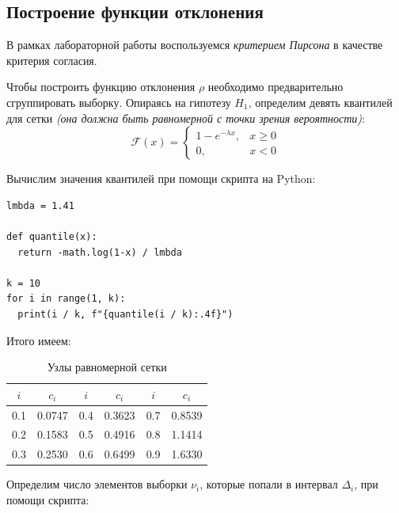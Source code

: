 \subsection{Построение функции отклонения}

В рамках лабораторной работы воспользуемся \textit{критерием Пирсона} в качестве критерия согласия.

Чтобы построить функцию отклонения \( \rho \) необходимо предварительно сгруппировать выборку. Опираясь на гипотезу \( H_1 \), определим девять квантилей для сетки \textit{(она должна быть равномерной с точки зрения вероятности)}:
\[
    \mathcal{F}(x)=
    \begin{cases}
        1-e^{-\lambda x}, &x\geq 0\\
        0, & x<0
    \end{cases}
\]

Вычислим значения квантилей при помощи скрипта на Python:

\begin{lstlisting}[caption=Расчёт квантилей экспоненциального распределения]
lmbda = 1.41

def quantile(x):
  return -math.log(1-x) / lmbda

k = 10
for i in range(1, k):
  print(i / k, f"{quantile(i / k):.4f}")
\end{lstlisting}

Итого имеем:

\begin{table}[H]
\centering
\begin{tabular}{|c|c||c|c||c|c|}
\hline
$i$ & $c_i$ & $i$ & $c_i$ & $i$ & $c_i$ \\ \hline\hline
0.1 & 0.0747 & 0.4 & 0.3623 & 0.7 & 0.8539 \\ \hline
0.2 & 0.1583 & 0.5 & 0.4916 & 0.8 & 1.1414 \\ \hline
0.3 & 0.2530 & 0.6 & 0.6499 & 0.9 & 1.6330 \\ \hline
\end{tabular}
\caption{Узлы равномерной сетки}
\label{tab:final_quantiles}
\end{table}

Определим число элементов выборки \( \nu_i \), которые попали в интервал \( \Delta_i \), при помощи скрипта:

